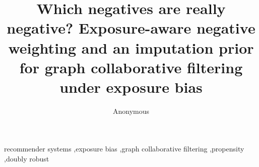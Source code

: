 \documentclass[preprint,12pt,authoryear]{elsarticle}
\begin{document}
\begin{frontmatter}
\title{Which negatives are really negative? Exposure-aware negative weighting and an imputation prior for graph collaborative filtering under exposure bias}
\author{Anonymous}
\begin{abstract}

\end{abstract}
\begin{keyword}
recommender systems \sep exposure bias \sep graph collaborative filtering \sep propensity \sep doubly robust
\end{keyword}
\end{frontmatter}










\end{document}
